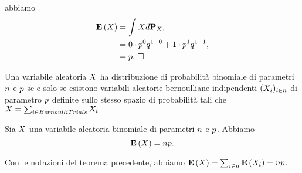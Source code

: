 abbiamo
\begin{align*}
  \ExpectedValue{\RandomVariable}
  &= \int \RandomVariable d\ProbabilityDistribution{\RandomVariable},\\
  &= 0 \cdot \BernoulliProbability^0 \BernoulliCoprobability^{1 - 0}
    + 1 \cdot \BernoulliProbability^1 \BernoulliCoprobability^{1 - 1},\\
  &= \BernoulliProbability.\text{ \EndProof}
\end{align*} 
\begin{Theorem}
  Una variabile aleatoria $X$ ha distribuzione di probabilit\`a
  binomiale di parametri
  $n$ e
  $p$
  se e solo se esistono variabili aleatorie bernoulliane indipendenti
  $(X_i)_{i \in n}$
  di parametro
  $p$
  definite sullo stesso spazio di probabilit\`a tali che
  $X = \sum_{i \in BernoulliTrials} X_i$
\end{Theorem}
\begin{Corollary}
  Sia $X$ una variabile aleatoria binomiale di parametri
  $n$ e $p$. Abbiamo
  \[
    \mathbf{E} \left ( X \right ) = np.
  \]
\end{Corollary}
\Proof Con le notazioni del teorema precedente, abbiamo
$\mathbf{E} \left ( X \right )
= \sum_{i \in n} \mathbf{E} \left ( X_i \right )
= np$. \EndProof
